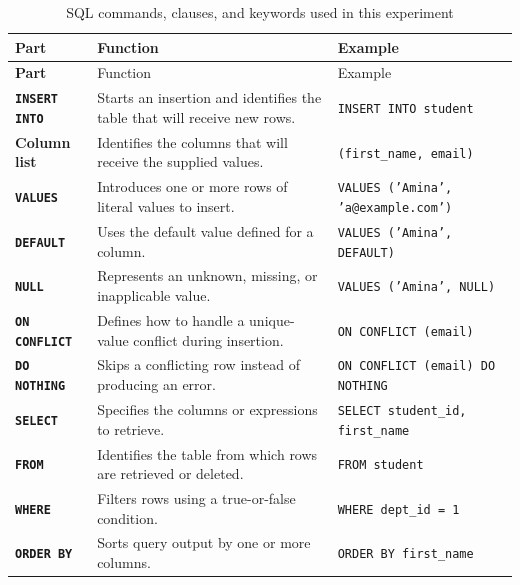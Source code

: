 \documentclass[12pt,a4paper]{article}
\begin{document}
\begingroup
{}
\small
\renewcommand{\arraystretch}{1.25}
\begin{longtable}{>{\bfseries}p{2.7cm} p{4cm} p{5.8cm}}
\caption{SQL commands, clauses, and keywords used in this experiment}
\label{tab:sql_parts}\\
\toprule
Part & Function & Example \\
\midrule
\endfirsthead
\toprule
Part & Function & Example \\
\midrule
\endhead
\bottomrule
\endfoot
\texttt{INSERT INTO} & Starts an insertion and identifies the table that will receive new rows. &
\texttt{INSERT INTO student} \\

Column list & Identifies the columns that will receive the supplied values. &
\texttt{(first\_name, email)} \\

\texttt{VALUES} & Introduces one or more rows of literal values to insert. &
\texttt{VALUES ('Amina', 'a@example.com')} \\

\texttt{DEFAULT} & Uses the default value defined for a column. &
\texttt{VALUES ('Amina', DEFAULT)} \\

\texttt{NULL} & Represents an unknown, missing, or inapplicable value. &
\texttt{VALUES ('Amina', NULL)} \\

\texttt{ON CONFLICT} & Defines how to handle a unique-value conflict during insertion. &
\texttt{ON CONFLICT (email)} \\

\texttt{DO NOTHING} & Skips a conflicting row instead of producing an error. &
\texttt{ON CONFLICT (email) DO NOTHING} \\

\texttt{SELECT} & Specifies the columns or expressions to retrieve. &
\texttt{SELECT student\_id, first\_name} \\

\texttt{FROM} & Identifies the table from which rows are retrieved or deleted. &
\texttt{FROM student} \\

\texttt{WHERE} & Filters rows using a true-or-false condition. &
\texttt{WHERE dept\_id = 1} \\

\texttt{ORDER BY} & Sorts query output by one or more columns. &
\texttt{ORDER BY first\_name} \\


\end{longtable}
\end{document}
